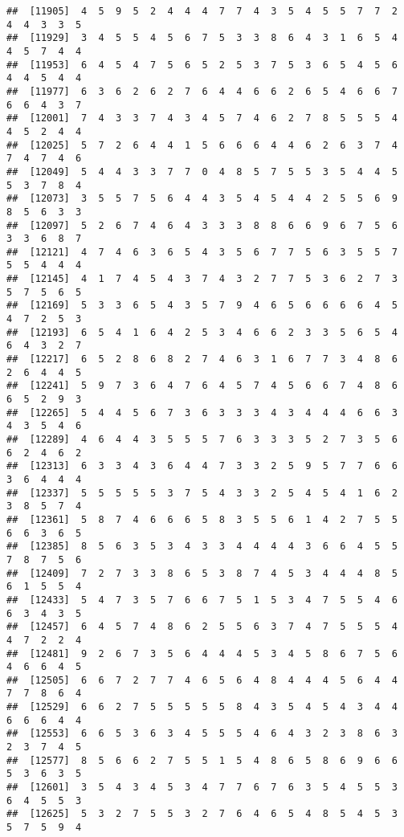 \documentclass[
]{book}
\begin{document}
\begin{verbatim}
##  [11905]  4  5  9  5  2  4  4  4  7  7  4  3  5  4  5  5  7  7  2  4  4  3  3  5
##  [11929]  3  4  5  5  4  5  6  7  5  3  3  8  6  4  3  1  6  5  4  4  5  7  4  4
##  [11953]  6  4  5  4  7  5  6  5  2  5  3  7  5  3  6  5  4  5  6  4  4  5  4  4
##  [11977]  6  3  6  2  6  2  7  6  4  4  6  6  2  6  5  4  6  6  7  6  6  4  3  7
##  [12001]  7  4  3  3  7  4  3  4  5  7  4  6  2  7  8  5  5  5  4  4  5  2  4  4
##  [12025]  5  7  2  6  4  4  1  5  6  6  6  4  4  6  2  6  3  7  4  7  4  7  4  6
##  [12049]  5  4  4  3  3  7  7  0  4  8  5  7  5  5  3  5  4  4  5  5  3  7  8  4
##  [12073]  3  5  5  7  5  6  4  4  3  5  4  5  4  4  2  5  5  6  9  8  5  6  3  3
##  [12097]  5  2  6  7  4  6  4  3  3  3  8  8  6  6  9  6  7  5  6  3  3  6  8  7
##  [12121]  4  7  4  6  3  6  5  4  3  5  6  7  7  5  6  3  5  5  7  5  5  4  4  4
##  [12145]  4  1  7  4  5  4  3  7  4  3  2  7  7  5  3  6  2  7  3  5  7  5  6  5
##  [12169]  5  3  3  6  5  4  3  5  7  9  4  6  5  6  6  6  6  4  5  4  7  2  5  3
##  [12193]  6  5  4  1  6  4  2  5  3  4  6  6  2  3  3  5  6  5  4  6  4  3  2  7
##  [12217]  6  5  2  8  6  8  2  7  4  6  3  1  6  7  7  3  4  8  6  2  6  4  4  5
##  [12241]  5  9  7  3  6  4  7  6  4  5  7  4  5  6  6  7  4  8  6  6  5  2  9  3
##  [12265]  5  4  4  5  6  7  3  6  3  3  3  4  3  4  4  4  6  6  3  4  3  5  4  6
##  [12289]  4  6  4  4  3  5  5  5  7  6  3  3  3  5  2  7  3  5  6  6  2  4  6  2
##  [12313]  6  3  3  4  3  6  4  4  7  3  3  2  5  9  5  7  7  6  6  3  6  4  4  4
##  [12337]  5  5  5  5  5  3  7  5  4  3  3  2  5  4  5  4  1  6  2  3  8  5  7  4
##  [12361]  5  8  7  4  6  6  6  5  8  3  5  5  6  1  4  2  7  5  5  6  6  3  6  5
##  [12385]  8  5  6  3  5  3  4  3  3  4  4  4  4  3  6  6  4  5  5  7  8  7  5  6
##  [12409]  7  2  7  3  3  8  6  5  3  8  7  4  5  3  4  4  4  8  5  6  1  5  5  4
##  [12433]  5  4  7  3  5  7  6  6  7  5  1  5  3  4  7  5  5  4  6  6  3  4  3  5
##  [12457]  6  4  5  7  4  8  6  2  5  5  6  3  7  4  7  5  5  5  4  4  7  2  2  4
##  [12481]  9  2  6  7  3  5  6  4  4  4  5  3  4  5  8  6  7  5  6  4  6  6  4  5
##  [12505]  6  6  7  2  7  7  4  6  5  6  4  8  4  4  4  5  6  4  4  7  7  8  6  4
##  [12529]  6  6  2  7  5  5  5  5  5  8  4  3  5  4  5  4  3  4  4  6  6  6  4  4
##  [12553]  6  6  5  3  6  3  4  5  5  5  4  6  4  3  2  3  8  6  3  2  3  7  4  5
##  [12577]  8  5  6  6  2  7  5  5  1  5  4  8  6  5  8  6  9  6  6  5  3  6  3  5
##  [12601]  3  5  4  3  4  5  3  4  7  7  6  7  6  3  5  4  5  5  3  6  4  5  5  3
##  [12625]  5  3  2  7  5  5  3  2  7  6  4  6  5  4  8  5  4  5  3  5  7  5  9  4

\end{verbatim}
\end{document}

